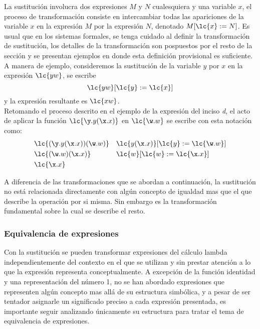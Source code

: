 La sustitución involucra dos expresiones \(M\) y \(N\) cualesquiera y una variable
\(x\), el proceso de transformación consiste en intercambiar todas las
apariciones de la variable \(x\) en la expresión \(M\) por la expresión \(N\),
denotado \(M[\lc{x}:=N]\). Es usual que en los sistemas formales, se tenga
cuidado al definir la transformación de sustitución, los detalles de la
transformación son pospuestos por el resto de la sección y se presentan
ejemplos en donde esta definición provisional es suficiente.\\

A manera de ejemplo, consideremos la sustitución de la variable \(y\) por \(x\)
en la expresión \(\lc{y w}\), se escribe
\[\lc{y w}[\lc{y}:=\lc{x}]\]
y la expresión resultante es \(\lc{x w}\).\\

Retomando el proceso descrito en el ejemplo de la expresión del inciso \emph{d},
el acto de aplicar la función \(\lc{\y.y(\x.x)}\) en \(\lc{\w.w}\) se escribe
con esta notación como:
\begin{align*}
  &\lc{(\y.y(\x.x))(\w.w)} & &\lc{y(\x.x)}[\lc{y}:=\lc{\w.w}]\\
  &\lc{(\w.w)(\x.x)}       & &\lc{w}[\lc{w}:=\lc{\x.x}]\\
  &\lc{\x.x}               & &
\end{align*}

A diferencia de las transformaciones que se abordan a continuación, la
sustitución no está relacionada directamente con algún concepto de igualdad mas
que el que describe la operación por si misma. Sin embargo es la transformación
fundamental sobre la cual se describe el resto.\\

\subsubsection{Equivalencia de expresiones}

Con la sustitución se pueden transformar expresiones del cálculo lambda
independientemente del contexto en el que se utilizan y sin prestar atención a
lo que la expresión representa conceptualmente. A excepción de la función
identidad y una representación del número 1, no se han abordado expresiones que
representen algún concepto mas allá de su estructura simbólica, y a pesar de ser
tentador asignarle un significado preciso a cada expresión presentada, es importante
seguir analizando únicamente su estructura para tratar el tema de equivalencia
de expresiones.\\

